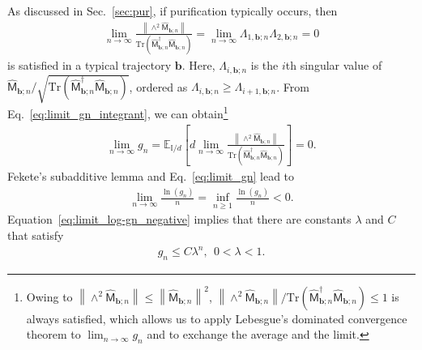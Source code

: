\documentclass[preprint,pteplogo]{ptephy_v2}%
\numberwithin{equation}{section}
\theoremstyle{definition}
\begin{document}
As discussed in Sec.~\ref{sec:pur}, if purification typically occurs, then
\begin{align}
    \lim_{n\rightarrow\infty}\frac{\left\|\land^2\hat{\mathsf{M}}_{\bm{b};n}\right\|}
    {\mathrm{Tr}\left(\hat{\mathsf{M}}_{\bm{b};n}^\dagger\hat{\mathsf{M}}_{\bm{b};n}\right)}=\lim_{n\rightarrow\infty}\Lambda_{1,\bm{b};n}\Lambda_{2,\bm{b};n}=0
    \label{eq:limit_gn_integrant}
\end{align}
is satisfied in a typical trajectory $\bm{b}$. 
Here, $\Lambda_{i,\bm{b};n}$ is the $i$th singular value of $\hat{\mathsf{M}}_{\bm{b};n}/\sqrt{\mathrm{Tr}\left(\hat{\mathsf{M}}_{\bm{b};n}^\dagger\hat{\mathsf{M}}_{\bm{b};n}\right)}$, ordered as $\Lambda_{i,\bm{b};n}\geq\Lambda_{i+1,\bm{b};n}$.  
From Eq.~\eqref{eq:limit_gn_integrant}, we can obtain\footnote{
Owing to $\left\|\land^2\hat{\mathsf{M}}_{\bm{b};n}\right\|\leq\left\|\hat{\mathsf{M}}_{\bm{b};n}\right\|^2$, $\left\|\land^2\hat{\mathsf{M}}_{\bm{b};n}\right\|/\mathrm{Tr}\left(\hat{\mathsf{M}}_{\bm{b};n}^\dagger\hat{\mathsf{M}}_{\bm{b};n}\right)\leq1$ is always satisfied, which allows us to apply Lebesgue's dominated convergence theorem to $\lim_{n\rightarrow\infty}g_n$ and to exchange the average and the limit.
}
\begin{align}
    \lim_{n\rightarrow\infty}g_n
    =\mathbb{E}_{\mathbb{I}/d}\left[d\lim_{n\rightarrow\infty}\frac{\left\|\land^2\hat{\mathsf{M}}_{\bm{b};n}\right\|}
    {\mathrm{Tr}\left(\hat{\mathsf{M}}_{\bm{b};n}^\dagger\hat{\mathsf{M}}_{\bm{b};n}\right)}\right]=0.
    \label{eq:limit_gn}
\end{align}
Fekete's subadditive lemma and Eq.~\eqref{eq:limit_gn} lead to
\begin{align}
    \lim_{n\rightarrow\infty}\frac{\ln(g_n)}{n}=\inf_{n\geq1}\frac{\ln(g_n)}{n}<0.
    \label{eq:limit_log-gn_negative}
\end{align}
Equation~\eqref{eq:limit_log-gn_negative} implies that there are constants $\lambda$ and $C$ that satisfy 
\begin{align}
    g_n \leq C\lambda^n,\ \ 0<\lambda<1.
    \label{eq:inequality_gn_exponential-decay}
\end{align}
\end{document}
